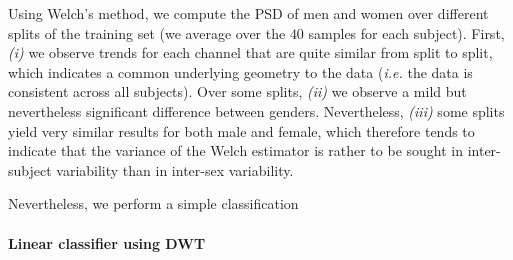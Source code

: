 Using Welch's method, we compute the PSD of men and women over different splits of the training set (we average over the $40$ samples for each subject). First, \emph{(i)} we observe trends for each channel that are quite similar from split to split, which indicates a common underlying geometry to the data (\emph{i.e.} the data is consistent across all subjects). Over some splits, \emph{(ii)} we observe a mild but nevertheless significant difference between genders. Nevertheless, \emph{(iii)} some splits yield very similar results for both male and female, which therefore tends to indicate that the variance of the Welch estimator is rather to be sought in inter-subject variability than in inter-sex variability.


Nevertheless, we perform a simple classification 
\paragraph{Linear classifier using DWT}